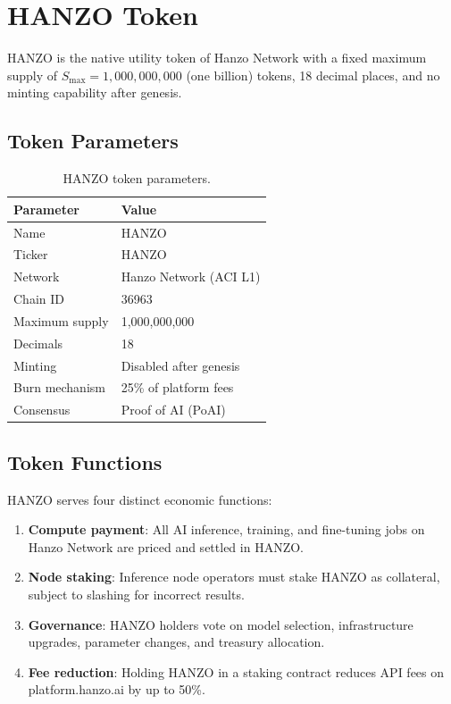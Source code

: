 \section{HANZO Token}

\label{sec:token}

\begin{definition}
HANZO is the native utility token of Hanzo Network with a fixed maximum supply of
$S_{\max} = 1{,}000{,}000{,}000$ (one billion) tokens, 18 decimal places, and no
minting capability after genesis.
\end{definition}

\subsection{Token Parameters}

\begin{table}[H]
\centering
\small
\begin{tabular}{ll}
\toprule
\textbf{Parameter} & \textbf{Value} \\
\midrule
Name & HANZO \\
Ticker & HANZO \\
Network & Hanzo Network (ACI L1) \\
Chain ID & 36963 \\
Maximum supply & 1,000,000,000 \\
Decimals & 18 \\
Minting & Disabled after genesis \\
Burn mechanism & 25\% of platform fees \\
Consensus & Proof of AI (PoAI) \\
\bottomrule
\end{tabular}
\caption{HANZO token parameters.}
\label{tab:params}
\end{table}

\subsection{Token Functions}

HANZO serves four distinct economic functions:

\begin{enumerate}[leftmargin=1.4em]
    \item \textbf{Compute payment}: All AI inference, training, and fine-tuning
    jobs on Hanzo Network are priced and settled in HANZO.
    \item \textbf{Node staking}: Inference node operators must stake HANZO as
    collateral, subject to slashing for incorrect results.
    \item \textbf{Governance}: HANZO holders vote on model selection,
    infrastructure upgrades, parameter changes, and treasury allocation.
    \item \textbf{Fee reduction}: Holding HANZO in a staking contract reduces
    API fees on platform.hanzo.ai by up to 50\%.
\end{enumerate}

